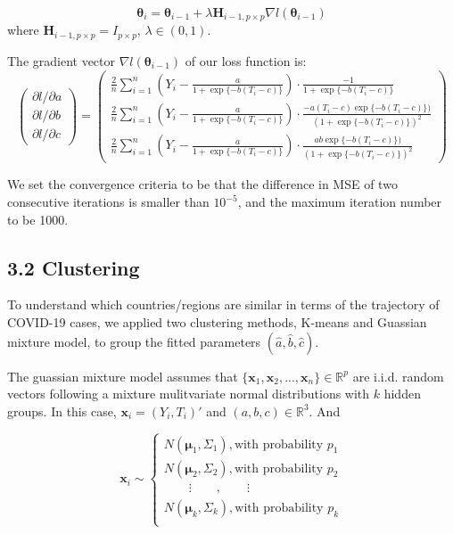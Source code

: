 \documentclass[
]{article}
\begin{document}
\[
\boldsymbol{\theta}_i = \boldsymbol{\theta}_{i-1} + \lambda \boldsymbol H_{i-1, p \times p} \nabla l(\boldsymbol{\theta}_{i-1})
\] where \(\boldsymbol H_{i-1, p \times p} = I_{p \times p}\),
\(\lambda \in (0,1)\).

The gradient vector \(\nabla l(\boldsymbol{\theta}_{i-1})\) of our loss
function is: \begin{equation}
\begin{pmatrix}
  {\partial l}/{\partial a}\\
  {\partial l}/{\partial b}\\
  {\partial l}/{\partial c}
\end{pmatrix}
=
\begin{pmatrix}
  \frac{2}{n}\sum_{i=1}^n (Y_i - \frac{a}{ 1+ \exp \{-b(T_i-c)\}}) \cdot \frac{-1}{1+\exp \{-b(T_i-c)\} }\\
  \frac{2}{n}\sum_{i=1}^n (Y_i - \frac{a}{ 1+ \exp \{-b(T_i-c)\}}) \cdot \frac{-a(T_i-c) \exp\{-b(T_i-c)\})}{(1+\exp \{-b(T_i-c)\})^2} \\
  \frac{2}{n}\sum_{i=1}^n (Y_i - \frac{a}{ 1+ \exp \{-b(T_i-c)\}}) \cdot \frac{ab \exp\{-b(T_i-c)\})}{(1+\exp \{-b(T_i-c)\})^2}
\end{pmatrix}
\end{equation}

We set the convergence criteria to be that the difference in MSE of two
consecutive iterations is smaller than \(10^{-5}\), and the maximum
iteration number to be 1000.

\hypertarget{clustering}{%
\subsection{3.2 Clustering}\label{clustering}}

To understand which countries/regions are similar in terms of the
trajectory of COVID-19 cases, we applied two clustering methods, K-means
and Guassian mixture model, to group the fitted parameters
\((\hat{a},\hat{b},\hat{c})\).

The guassian mixture model assumes that
\(\{\mathbf x_1,\mathbf x_2,...,\mathbf x_n \} \in \mathbb R^p\) are
i.i.d. random vectors following a mixture mulitvariate normal
distributions with \(k\) hidden groups. In this case,
\(\mathbf x_i = (Y_i, T_i)'\) and \((a,b,c) \in \mathbb R^3\). And

\[\mathbf x_i\sim
\begin{cases}
N(\boldsymbol \mu_1, \Sigma_1), \mbox{with probability }p_1 \\
N(\boldsymbol \mu_2, \Sigma_2), \mbox{with probability }p_2\\
\quad\quad\vdots\quad\quad,\quad\quad \vdots\\
N(\boldsymbol \mu_k, \Sigma_k), \mbox{with probability }p_k\\
\end{cases}
\]
\end{document}
